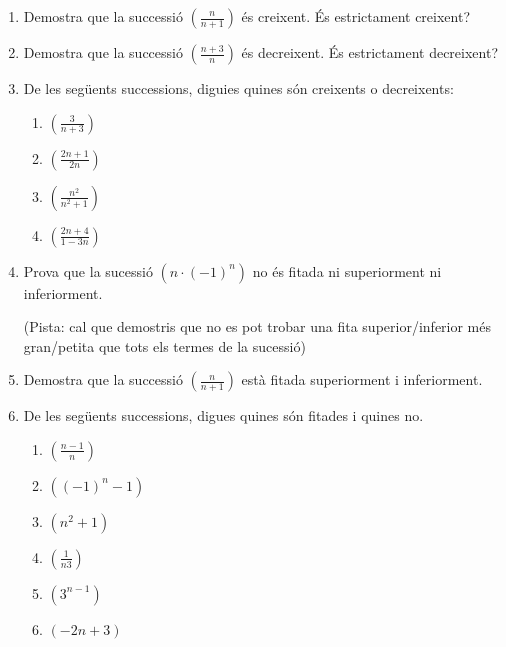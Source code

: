 \documentclass{article}
\begin{document}
	\author{Mireia Dosil}
	\date{text}


\begin{enumerate}
 
\item Demostra que la successió $(\frac{n}{n+1})$ és creixent. És estrictament creixent?
\item Demostra que la successió $(\frac{n+3}{n})$ és decreixent. És estrictament decreixent?
\item De les següents successions, diguies quines són creixents o decreixents:

\begin{enumerate}
	\item $(\frac{3}{n+3})$
	\item $(\frac{2n+1}{2n})$
	\item $(\frac{n^2}{n^2+1})$
	\item $(\frac{2n+4}{1-3n})$
\end{enumerate}
 
\item Prova que la sucessió $(n\cdot (-1)^n)$ no és fitada ni superiorment ni inferiorment. 

\tiny(Pista: cal que demostris que no es pot trobar una fita superior/inferior més gran/petita que tots els termes de la sucessió)

\normalsize
\item Demostra que la successió $(\frac{n}{n+1})$ està fitada superiorment i inferiorment.

\item De les següents successions, digues quines són fitades i quines no.
\begin{enumerate}
	\item $(\frac{n-1}{n})$
	\item $((-1)^n-1)$
	\item $(n^2+1)$
	\item $(\frac{1}{n3})$
	\item $(3^{n-1})$
	\item $(-2n+3)$
	
\end{enumerate}



\end{enumerate}
 
\end{document}
